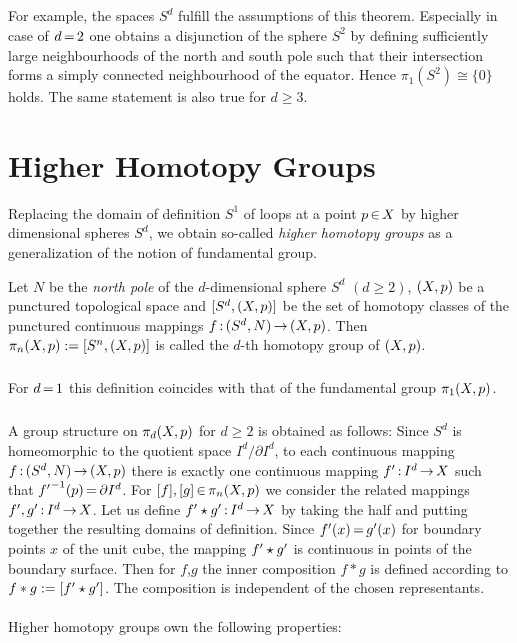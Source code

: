 \documentclass[11pt,twoside]{article}
\begin{document}
\subparagraph{}
For example,
the spaces $S^d$ fulfill the assumptions of this theorem.
Especially in case of $d {\,=\,} 2$ one obtains a disjunction of the sphere $S^2$
by defining sufficiently large neighbourhoods of the north and south pole
such that
their intersection forms a simply connected neighbourhood of the equator.
Hence $\pi_1(S^2) \cong \{0\}$ holds.
The same statement is also true for $d \geq 3$.

\section{Higher Homotopy Groups}
Replacing the domain of definition $S^1$ of loops at a point $p {\,\in\,} X$
by higher dimensional spheres $S^d$,
we obtain so-called \textit{higher homotopy groups} as a generalization
of the notion of fundamental group.

\begin{definition} %
Let $N$ be the \textit{north pole}
of the $d$-dimensional sphere $S^d$ $(d \geq 2)$,
$(X,p)$ be a punctured topological space and
$[S^d,(X,p)]$ be the set of homotopy classes
of the punctured continuous mappings $f{\,:\,}(S^d,N) {\,\to\,} (X,p)$.
Then $\pi_n(X,p) := [S^n,(X,p)]$ is called
the $d$-th homotopy group of $(X,p)$.
\end{definition}

\subparagraph{}
For $d {\,=\,} 1$ this definition coincides with that of the fundamental group
$\pi_1(X,p)$.

\subparagraph{}
A group structure on $\pi_d(X,p)$ for $d \geq 2$ is obtained as follows:
Since $S^d$ is homeomorphic to the quotient space $I^d / \partial I^d$,
to each continuous mapping $f{\,:\,}(S^d,N) {\,\to\,} (X,p)$
there is exactly one continuous mapping $f' {\,:\,} I^d {\,\to\,} X$
such that ${f'}^{-1}(p) {\,=\,} \partial I^d$.
For $[f],[g] {\,\in\,} \pi_n(X,p)$ we consider the related mappings
$f',g' {\,:\,} I^d {\,\to\,} X$.
Let us define $f' \star g' {\,:\,} I^d {\,\to\,} X$ by taking the half and
putting together the resulting domains of definition.
Since $f'(x) {\,=\,} g'(x)$ for boundary points $x$ of the unit cube,
the mapping $f' \star g'$ is continuous in points of the boundary surface.
Then for $f$,$g$ the inner composition $f \ast g$ is defined according to
$f \ast g := [f' \star g']$.
The composition is independent of the chosen representants.

\paragraph{}
Higher homotopy groups own the following properties:
\end{document}
